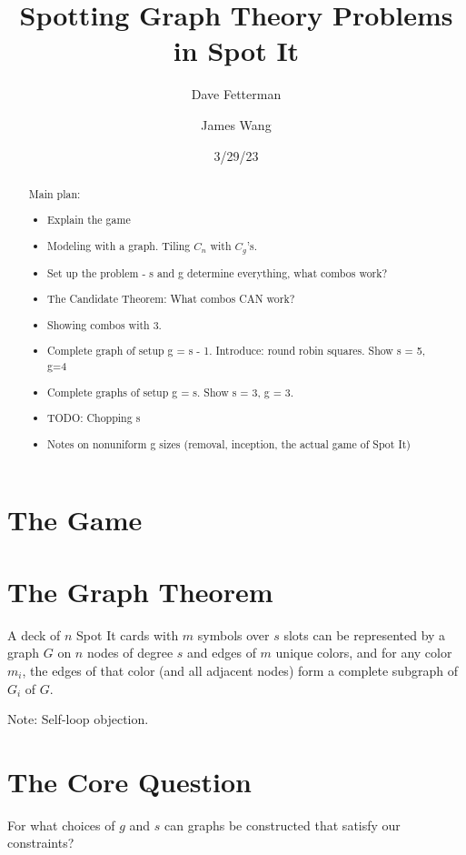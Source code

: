 \documentclass[11pt, oneside]{article} 	%
\title{Spotting Graph Theory Problems in Spot It}
\author[1]{Dave Fetterman}
\author[2]{James Wang}
\affil[1]{Obviously Unemployed}
\affil[2]{Surprisingly Employed}
\date{3/29/23}
\begin{document}
\maketitle

\begin{abstract}

Main plan:
\begin{itemize}
\item Explain the game
\item Modeling with a graph.  Tiling $C_n$ with $C_g$'s.
\item Set up the problem - s and g determine everything, what combos work?
\item The Candidate Theorem: What combos CAN work?
\item Showing combos with 3.
\item Complete graph of setup  g = s - 1.  Introduce: round robin squares.  Show s = 5, g=4
\item Complete graphs of setup g = s.  Show s = 3, g = 3.
\item TODO: Chopping s 
\item Notes on nonuniform g sizes (removal, inception, the actual game of Spot It)
\end{itemize}

\end{abstract}

\section{The Game}

\section{The Graph Theorem}

\begin{framed}
A deck of $n$ Spot It cards with $m$ symbols over $s$ slots can be represented by a graph $G$ on $n$ nodes of degree $s$ and edges of $m$ unique colors, and for any color $m_i$, the edges of that color (and all adjacent nodes) form a complete subgraph of $G_i$ of $G$. 
\end{framed}

Note: Self-loop objection.

\section{The Core Question}

\begin{framed}
For what choices of $g$ and $s$ can graphs be constructed that satisfy our constraints? 
\end{framed}
\end{document}
